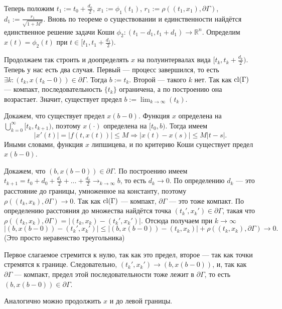 Теперь положим $t_1 := t_0 + \frac{d_0}{2}$, $x_1 := \phi_1(t_1)$, $r_1 := \rho((t_1, x_1), \partial \Gamma)$, $d_1 := \frac{r_1}{\sqrt {1 + M^2}}$.
Вновь по теореме о существовании и единственности найдётся единственное решение задачи Коши $\phi_2: (t_1 - d_1, t_1 + d_1) \to \mathbb R^n$.
Определим $x(t) = \phi_2(t)$ при $t \in [t_1, t_1 + \frac{d_1}{2})$.

Продолжаем так строить и доопределять $x$ на полуинтервалах вида $[t_k, t_k + \frac{d_k}{2})$.
Теперь у нас есть два случая. Первый --- процесс завершился, то есть $\exists k: (t_k, x(t_k - 0)) \in \partial \Gamma$. Тогда $b := t_k$.
Второй --- такого $k$ нет.
Так как $\operatorname{cl}(\Gamma)$ --- компакт, последовательность $\{t_k\}$ ограничена, а по построению она возрастает.
Значит, существует предел $b := \lim_{k \to \infty}(t_k)$.

Докажем, что существует предел $x(b - 0)$.
Функция $x$ определена на $\bigcup_{k=0}^{\infty} [t_k, t_{k+1})$, поэтому $x( \cdot )$ определена на $[t_0, b)$.
Тогда имеем
\[
    |x'(t)| = |f(t, x(t))| \le M \Rightarrow |x(t) - x(s)| \le M |t - s|.
\]
Иными словами, функция $x$ липшицева, и по критерию Коши существует предел $x(b - 0)$.

Докажем, что $(b, x(b - 0)) \in \partial \Gamma$.
По построению имеем $t_{k+1} = t_0 + d_0 + \frac{d_1}{2} + \dots + \frac{d_k}{2} \to_{k \to \infty} b$, то есть $d_k \to 0$.
По определению $d_k$ --- это расстояние до границы, умноженное на константу, поэтому $\rho((t_k, x_k), \partial \Gamma) \to 0$.
Так как $\operatorname{cl}(\Gamma)$ --- компакт, $\partial \Gamma$ --- это тоже компакт.
По определению расстояния до множества найдётся точка $(t_k', x_k') \in \partial \Gamma$, такая что $\rho((t_k, x_k), \partial \Gamma) = |(t_k, x_k) - (t_k', x_k')|$.
Отсюда получаем при $k \to \infty$
\[
    |(b, x(b - 0)) - (t_k', x_k')| \le |(b, x(b - 0)) - (t_k, x_k)| + \rho((t_k, x_k), \partial \Gamma) \to 0.
\]
(Это просто неравенство треугольника)

Первое слагаемое стремится к нулю, так как это предел, второе --- так как точки стремятся к границе.
Следовательно, $(t_k', x_k') \to (b, x(b - 0))$, и, так как $\partial \Gamma$ --- компакт, предел этой последовательности тоже лежит в $\partial \Gamma$, то есть $(b, x(b - 0)) \in \partial \Gamma$.

Аналогично можно продолжить $x$ и до левой границы.

